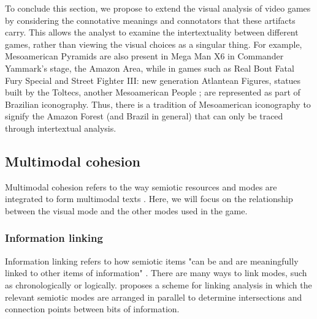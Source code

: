 \documentclass[english]{textolivre}
\begin{document}
To conclude this section, we propose to extend the visual analysis of video games by considering the connotative meanings and connotators that these artifacts carry. This allows the analyst to examine the intertextuality between different games, rather than viewing the visual choices as a singular thing. For example, Mesoamerican Pyramids are also present in Mega Man X6 \cite{capcom_mega_2001} in Commander Yammark's stage, the Amazon Area, while in games such as Real Bout Fatal Fury Special \cite{snk_real_1997} and Street Fighter III: new generation \cite{capcom_street_1997} Atlantean Figures, statues built by the Toltecs, another Mesoamerican People \cite[p. 17, 202]{aguilar-moreno_handbook_2006}; \cite[p. 42, 400]{evans_ancient_2013} are represented as part of Brazilian iconography. Thus, there is a tradition of Mesoamerican iconography to signify the Amazon Forest (and Brazil in general) that can only be traced through intertextual analysis.

\subsection{Multimodal cohesion}\label{sec-organizacao}
Multimodal cohesion refers to the way semiotic resources and modes are integrated to form multimodal texts \cite[p. 179]{van_leeuwen_introducing_2005}. Here, we will focus on the relationship between the visual mode and the other modes used in the game.

\subsubsection{Information linking}\label{sec-organizacao-latex}
Information linking refers to how semiotic items "can be and are meaningfully linked to other items of information" \cite[p.~219]{van_leeuwen_introducing_2005}. There are many ways to link modes, such as chronologically or logically. \textcite[p.~219-47]{van_leeuwen_introducing_2005} proposes a scheme for linking analysis in which the relevant semiotic modes are arranged in parallel to determine intersections and connection points between bits of information.
\end{document}
